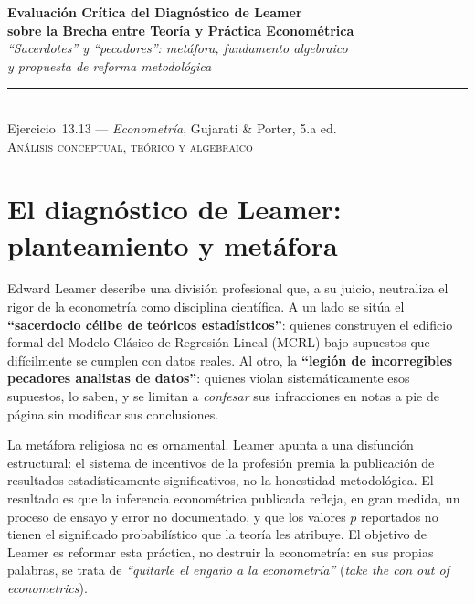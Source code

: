 \documentclass[12pt, letterpaper]{article}
\begin{document}
\begin{center}
  {\LARGE\bfseries Evaluación Crítica del Diagnóstico de Leamer}\\[6pt]
  {\LARGE\bfseries sobre la Brecha entre Teoría y Práctica Econométrica}\\[12pt]
  {\large\itshape ``Sacerdotes'' y ``pecadores'': metáfora, fundamento algebraico}\\
  {\large\itshape y propuesta de reforma metodológica}\\[14pt]
  \rule{0.55\linewidth}{0.6pt}\\[8pt]
  {\normalsize Ejercicio~13.13 --- \textit{Econometría}, Gujarati \& Porter, 5.a ed.}\\[4pt]
  {\small\textsc{Análisis conceptual, teórico y algebraico}}
\end{center}

\vspace{10pt}

\section{El diagnóstico de Leamer: planteamiento y metáfora}

Edward Leamer describe una división profesional que, a su juicio, neutraliza
el rigor de la econometría como disciplina científica. A un lado se sitúa el
\textbf{``sacerdocio célibe de teóricos estadísticos''}: quienes construyen
el edificio formal del Modelo Clásico de Regresión Lineal (MCRL) bajo
supuestos que difícilmente se cumplen con datos reales. Al otro, la
\textbf{``legión de incorregibles pecadores analistas de datos''}: quienes
violan sistemáticamente esos supuestos, lo saben, y se limitan a
\emph{confesar} sus infracciones en notas a pie de página sin modificar sus
conclusiones.

La metáfora religiosa no es ornamental. Leamer apunta a una disfunción
estructural: el sistema de incentivos de la profesión premia la publicación
de resultados estadísticamente significativos, no la honestidad metodológica.
El resultado es que la inferencia econométrica publicada refleja, en gran
medida, un proceso de ensayo y error no documentado, y que los valores $p$
reportados no tienen el significado probabilístico que la teoría les atribuye.
El objetivo de Leamer es reformar esta práctica, no destruir la econometría:
en sus propias palabras, se trata de
\emph{``quitarle el engaño a la econometría''}
(\textit{take the con out of econometrics}).
\end{document}
